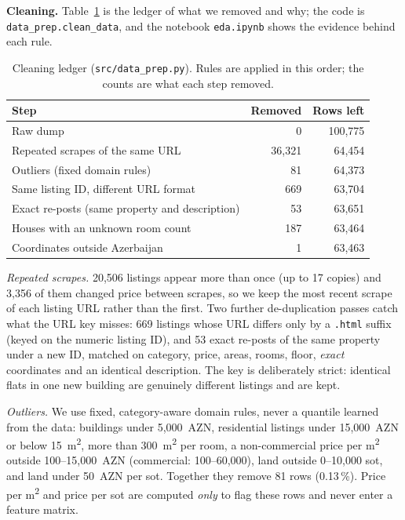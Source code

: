 \documentclass[10pt,twocolumn,a4paper]{article}
\begin{document}
\textbf{Cleaning.} Table~\ref{tab:cleaning} is the ledger of what we removed
and why; the code is \texttt{data\_prep.clean\_data}, and the notebook
\texttt{eda.ipynb} shows the evidence behind each rule.

\begin{table}[t]
  \centering
  \caption{Cleaning ledger (\texttt{src/data\_prep.py}). Rules are applied in
    this order; the counts are what each step removed.}
  \label{tab:cleaning}
  \footnotesize
  \begin{tabular}{@{}lrr@{}}
    \toprule
    Step & Removed & Rows left \\
    \midrule
    Raw dump                                      & 0      & 100{,}775 \\
    Repeated scrapes of the same URL              & 36{,}321 & 64{,}454 \\
    Outliers (fixed domain rules)                 & 81     & 64{,}373 \\
    Same listing ID, different URL format         & 669    & 63{,}704 \\
    Exact re-posts (same property and description)& 53     & 63{,}651 \\
    Houses with an unknown room count             & 187    & 63{,}464 \\
    Coordinates outside Azerbaijan                & 1      & 63{,}463 \\
    \bottomrule
  \end{tabular}
\end{table}

\emph{Repeated scrapes.} 20{,}506 listings appear more than once (up to 17
copies) and 3{,}356 of them changed price between scrapes, so we keep the most
recent scrape of each listing URL rather than the first. Two further
de-duplication passes catch what the URL key misses: 669 listings whose URL
differs only by a \texttt{.html} suffix (keyed on the numeric listing ID), and
53 exact re-posts of the same property under a new ID, matched on category,
price, areas, rooms, floor, \emph{exact} coordinates and an identical
description. The key is deliberately strict: identical flats in one new
building are genuinely different listings and are kept.

\emph{Outliers.} We use fixed, category-aware domain rules, never a quantile
learned from the data: buildings under 5{,}000~AZN, residential listings under
15{,}000~AZN or below 15~m\textsuperscript{2}, more than
300~m\textsuperscript{2} per room, a non-commercial price per
m\textsuperscript{2} outside 100--15{,}000~AZN (commercial: 100--60{,}000),
land outside 0--10{,}000 sot, and land under 50~AZN per sot. Together they
remove 81 rows (0.13\,\%). Price per m\textsuperscript{2} and price per sot
are computed \emph{only} to flag these rows and never enter a feature matrix.
\end{document}
